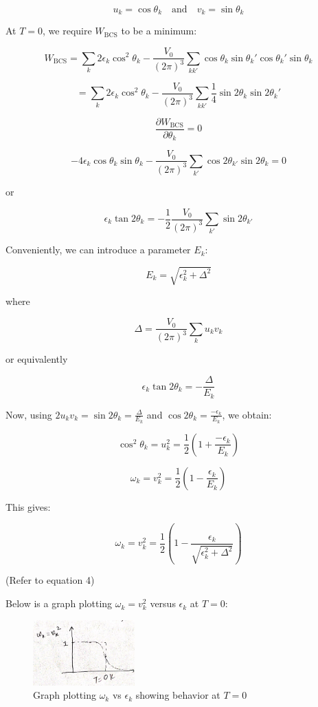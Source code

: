 \documentclass{article}
\begin{document}
\[
u_k = \cos \theta_k \quad \text{and} \quad v_k = \sin \theta_k \tag{5}
\]

At \( T = 0 \), we require \( W_{\text{BCS}} \) to be a minimum:

\[
W_{\text{BCS}} = \sum_k 2 \epsilon_k \cos^2 \theta_k - \frac{V_0}{(2\pi)^3} \sum_{k k'} \cos \theta_k \sin \theta_k' \cos \theta_k' \sin \theta_k
\]

\[
= \sum_k 2 \epsilon_k \cos^2 \theta_k - \frac{V_0}{(2\pi)^3} \sum_{k k'} \frac{1}{4} \sin 2\theta_k \sin 2\theta_k' \tag{6}
\]

\[
\frac{\partial W_{\text{BCS}}}{\partial \theta_k} = 0
\]

\[
-4 \epsilon_k \cos \theta_k \sin \theta_k - \frac{V_0}{(2\pi)^3} \sum_{k'} \cos 2\theta_{k'} \sin 2\theta_k = 0
\]

or

\[
\epsilon_k \tan 2\theta_k = -\frac{1}{2} \frac{V_0}{(2\pi)^3} \sum_{k'} \sin 2\theta_{k'}
\]

Conveniently, we can introduce a parameter \( E_k \):

\[
E_k = \sqrt{\epsilon_k^2 + \Delta^2}
\]

where

\[
\Delta = \frac{V_0}{(2\pi)^3} \sum_k u_k v_k
\]

or equivalently

\[
\epsilon_k \tan 2\theta_k = -\frac{\Delta}{E_k} \tag{*1}
\]

Now, using \( 2 u_k v_k = \sin 2\theta_k = \frac{\Delta}{E_k} \) and \( \cos 2\theta_k = \frac{-\epsilon_k}{E_k} \), we obtain:

\[
\cos^2 \theta_k = u_k^2 = \frac{1}{2} \left( 1 + \frac{-\epsilon_k}{E_k} \right)
\]

\[
\omega_k = v_k^2 = \frac{1}{2} \left( 1 - \frac{\epsilon_k}{E_k} \right)
\]

This gives:

\[
\omega_k = v_k^2 = \frac{1}{2} \left( 1 - \frac{\epsilon_k}{\sqrt{\epsilon_k^2 + \Delta^2}} \right)
\]

(Refer to equation 4)

Below is a graph plotting \( \omega_k = v_k^2 \) versus \( \epsilon_k \) at \( T = 0 \):

\begin{figure}[!htbp]
        \includegraphics[width=0.35\textwidth]{figures/epsilon_k.png}
    \caption{Graph plotting \( \omega_k \) vs \( \epsilon_k \) showing behavior at \( T = 0 \) }\label{fig:}
\end{figure}
\end{document}
